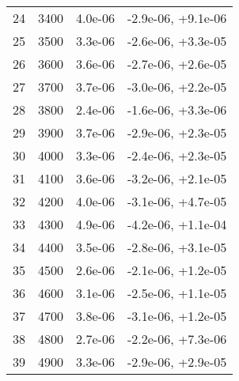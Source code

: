 \begin{table}
\begin{adjustbox}{width=1\textwidth/2}
\begin{tabular}{|c|c|c|c|}
\cline{1-4}
24 & 3400 & 4.0e-06 & -2.9e-06, +9.1e-06 \\
\cline{1-4}
25 & 3500 & 3.3e-06 & -2.6e-06, +3.3e-05 \\
\cline{1-4}
26 & 3600 & 3.6e-06 & -2.7e-06, +2.6e-05 \\
\cline{1-4}
27 & 3700 & 3.7e-06 & -3.0e-06, +2.2e-05 \\
\cline{1-4}
28 & 3800 & 2.4e-06 & -1.6e-06, +3.3e-06 \\
\cline{1-4}
29 & 3900 & 3.7e-06 & -2.9e-06, +2.3e-05 \\
\cline{1-4}
30 & 4000 & 3.3e-06 & -2.4e-06, +2.3e-05 \\
\cline{1-4}
31 & 4100 & 3.6e-06 & -3.2e-06, +2.1e-05 \\
\cline{1-4}
32 & 4200 & 4.0e-06 & -3.1e-06, +4.7e-05 \\
\cline{1-4}
33 & 4300 & 4.9e-06 & -4.2e-06, +1.1e-04 \\
\cline{1-4}
34 & 4400 & 3.5e-06 & -2.8e-06, +3.1e-05 \\
\cline{1-4}
35 & 4500 & 2.6e-06 & -2.1e-06, +1.2e-05 \\
\cline{1-4}
36 & 4600 & 3.1e-06 & -2.5e-06, +1.1e-05 \\
\cline{1-4}
37 & 4700 & 3.8e-06 & -3.1e-06, +1.2e-05 \\
\cline{1-4}
38 & 4800 & 2.7e-06 & -2.2e-06, +7.3e-06 \\
\cline{1-4}
39 & 4900 & 3.3e-06 & -2.9e-06, +2.9e-05 \\
\cline{1-4}
\end{tabular}
\end{adjustbox}
\end{table}

